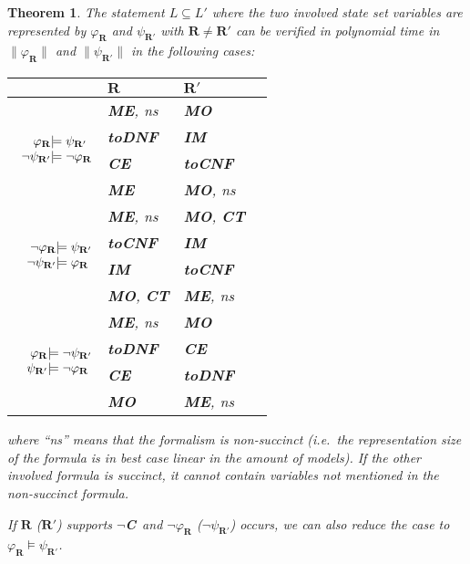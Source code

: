 \documentclass{article}
\newcommand{\ie}{i.e.\ }
\newtheorem{theorem}{Theorem}
\newcommand{\mo}{\textbf{MO}}
\newcommand{\ce}{\textbf{CE}}
\newcommand{\im}{\textbf{IM}}
\newcommand{\notc}{\textbf{$\lnot$C}}
\newcommand{\tocnf}{\textbf{toCNF}}
\newcommand{\todnf}{\textbf{toDNF}}
\newcommand{\me}{\textbf{ME}}
\newcommand{\ct}{\textbf{CT}}
\begin{document}
\begin{theorem}
The statement $L \subseteq L'$ where the two involved state set variables are
represented by $\varphi_{\mathbf R}$ and $\psi_{\mathbf R'}$ with $\mathbf
R \neq \mathbf R'$ can be verified in polynomial time in $\|\varphi_{\mathbf
R}\|$ and $\|\psi_{\mathbf R'}\|$ in the following cases:

\begin{center}
\begin{tabularx}{0.5\textwidth}{r|XXl}
& $\mathbf R$ & $\mathbf R'$ \\
\hline
\multirow{4}{*}{$\begin{array} {r@{}l@{}}
                  \varphi_{\mathbf R} &\models \psi_{\mathbf R'} \\
                  \lnot \psi_{\mathbf R'} &\models \lnot \varphi_{\mathbf R}
                \end{array}$}
 & \me, ns  & \mo      \\
 & \todnf   & \im      \\
 & \ce      & \tocnf   \\
 & \me      & \mo, ns  \\
\hline

\multirow{4}{*}{$\begin{array} {r@{}l@{}}
                  \lnot \varphi_{\mathbf R} &\models \psi_{\mathbf R'} \\
                  \lnot \psi_{\mathbf R'} &\models \varphi_{\mathbf R}
                \end{array}$}
 & \me, ns  & \mo, \ct \\
 & \tocnf   & \im      \\
 & \im      & \tocnf   \\
 & \mo, \ct & \me, ns  \\
\hline

\multirow{4}{*}{$\begin{array} {r@{}l@{}}
                  \varphi_{\mathbf R} &\models \lnot \psi_{\mathbf R'} \\
                  \psi_{\mathbf R'} &\models \lnot \varphi_{\mathbf R}
                \end{array}$}
 & \me, ns  & \mo      \\
 & \todnf   & \ce      \\
 & \ce      & \todnf   \\
 & \mo      & \me, ns  \\
\end{tabularx}
\end{center}

where ``ns'' means that the formalism is non-succinct (\ie the representation
size of the formula is in best case linear in the amount of models). If the
other involved formula is succinct, it cannot contain variables not mentioned
in the non-succinct formula.

If $\mathbf R$ ($\mathbf R'$) supports \notc\ and $\lnot \varphi_{\mathbf R}$
($\lnot \psi_{\mathbf R'}$) occurs, we can also reduce the case to $\varphi_{\mathbf
R} \models \psi_{\mathbf R'}$.
\label{thm:ps-mixedverification}
\end{theorem}
\end{document}
